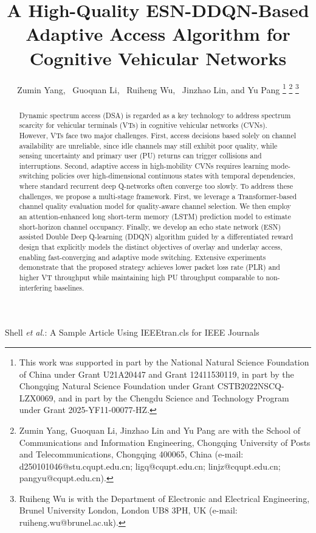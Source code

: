 \documentclass[journal]{IEEEtran}
\begin{document}
\title{A High-Quality ESN-DDQN-Based Adaptive Access Algorithm for Cognitive Vehicular Networks}
\author{Zumin Yang,~
        Guoquan Li,~
        Ruiheng Wu,~
        Jinzhao Lin,
        and Yu Pang
\thanks{This work was supported in part by the National Natural Science Foundation of China under Grant U21A20447 and Grant 12411530119, in part by the Chongqing Natural Science Foundation under Grant CSTB2022NSCQ-LZX0069, and in part by the Chengdu Science and Technology Program under Grant 2025-YF11-00077-HZ.}
\thanks{Zumin Yang, Guoquan Li, Jinzhao Lin and Yu Pang are with the School of Communications and Information Engineering, Chongqing University of Posts and Telecommunications, Chongqing 400065, China (e-mail: d250101046@stu.cqupt.edu.cn; ligq@cqupt.edu.cn; linjz@cqupt.edu.cn; pangyu@cqupt.edu.cn).}
\thanks{Ruiheng Wu is with the Department of Electronic and Electrical Engineering, Brunel University London, London UB8 3PH, UK (e-mail: ruiheng.wu@brunel.ac.uk).}}
%
{Shell \MakeLowercase{\textit{et al.}}: A Sample Article Using IEEEtran.cls for IEEE Journals}
\maketitle
\begin{abstract}
    Dynamic spectrum access (DSA) is regarded as a key technology to address spectrum scarcity for vehicular terminals (VTs) in cognitive vehicular networks (CVNs). However, VTs face two major challenges. First, access decisions based solely on channel availability are unreliable, since idle channels may still exhibit poor quality, while sensing uncertainty and primary user (PU) returns can trigger collisions and interruptions. Second, adaptive access in high-mobility CVNs requires learning mode-switching policies over high-dimensional continuous states with temporal dependencies, where standard recurrent deep Q-networks often converge too slowly. To address these challenges, we propose a multi-stage framework. First, we leverage a Transformer-based channel quality evaluation model for quality-aware channel selection. We then employ an attention-enhanced long short-term memory (LSTM) prediction model to estimate short-horizon channel occupancy. Finally, we develop an echo state network (ESN) assisted Double Deep Q-learning (DDQN) algorithm guided by a differentiated reward design that explicitly models the distinct objectives of overlay and underlay access, enabling fast-converging and adaptive mode switching. Extensive experiments demonstrate that the proposed strategy achieves lower packet loss rate (PLR) and higher VT throughput while maintaining high PU throughput comparable to non-interfering baselines.
\end{abstract}
\end{document}
